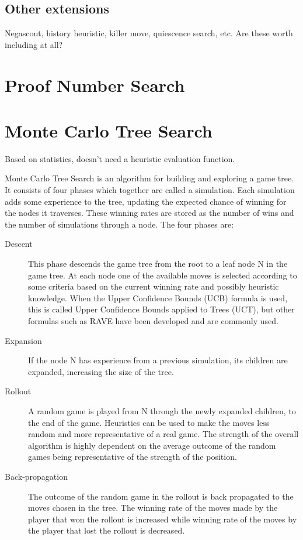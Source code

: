 \subsection{Other extensions}

Negascout, history heuristic, killer move, quiescence search, etc. Are these worth including at all?






\section{Proof Number Search}




\section{Monte Carlo Tree Search}

Based on statistics, doesn't need a heuristic evaluation function.

Monte Carlo Tree Search is an algorithm for building and exploring a game tree. It consists of four phases which together are called a simulation. Each simulation adds some experience to the tree, updating the expected chance of winning for the nodes it traverses. These winning rates are stored as the number of wins and the number of simulations through a node. The four phases are:
\begin{description}
\item[Descent] This phase descends the game tree from the root to a leaf node N in the game tree. At each node one of the available moves is selected according to some criteria based on the current winning rate and possibly heuristic knowledge. When the Upper Confidence Bounds (UCB) formula is used, this is called Upper Confidence Bounds applied to Trees (UCT), but other formulas such as RAVE have been developed and are commonly used.
\item[Expansion] If the node N has experience from a previous simulation, its children are expanded, increasing the size of the tree.
\item[Rollout] A random game is played from N through the newly expanded children, to the end of the game. Heuristics can be used to make the moves less random and more representative of a real game. The strength of the overall algorithm is highly dependent on the average outcome of the random games being representative of the strength of the position.
\item[Back-propagation] The outcome of the random game in the rollout is back propagated to the moves chosen in the tree. The winning rate of the moves made by the player that won the rollout is increased while winning rate of the moves by the player that lost the rollout is decreased.
\end{description}

